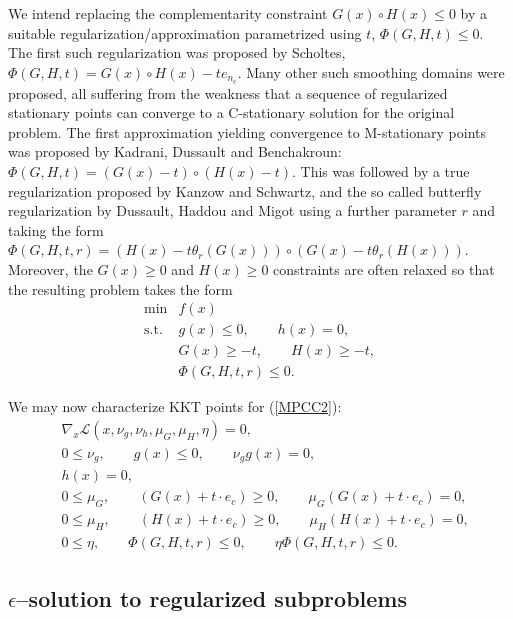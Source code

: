 \documentclass[12pt]{article}
\newcommand{\pref}[1]{(\ref{#1})}
\begin{document}
We intend replacing the complementarity constraint $G(x)\circ H(x)\leq 0$ by a suitable regularization/approximation parametrized using $t$, $\Phi(G,H,t)\le0$. The first such regularization was proposed by Scholtes, $\Phi(G,H,t) = G(x)\circ H(x) - te_{n_c}$. Many other such smoothing domains were proposed, all suffering from the weakness that a sequence of regularized stationary points can converge to a C-stationary solution for the original problem. The first approximation yielding convergence to M-stationary points was proposed by Kadrani, Dussault and Benchakroun: $\Phi(G,H,t) = (G(x)-t)\circ(H(x)-t)$. This was followed by a true regularization proposed by Kanzow and Schwartz, and the so called butterfly regularization by Dussault, Haddou and Migot using a further parameter $r$ and taking the form $\Phi(G,H,t,r) =  (H(x)-t\theta_r(G(x)))\circ(G(x)-t\theta_r(H(x)))$. Moreover, the $G(x)\ge0$ and $H(x)\ge0$ constraints are often relaxed so that the resulting problem takes the form
\begin{equation}\label{MPCC2}
 \begin{array}{ll} 
      \min &f(x)\\
      \textrm{s.t.}
          &g(x)\leq0,\qquad
          h(x)=0,\\
          &G(x)\geq -t,\qquad
          H(x)\geq -t,\\
          &\Phi(G,H,t,r)\le0.
 \end{array}
\end{equation}

We may now characterize KKT points for \pref{MPCC2}:
\begin{equation}\label{stat}
\begin{array}{cl}
&\nabla_{x}\mathcal{L}(x,\nu_g,\nu_h,\mu_{G},\mu_{H},\eta)=0,\\
&0\leq\nu_g, \qquad g(x)\leq0,\qquad \nu_gg(x)=0,\\
&h(x)=0,\\
&0\leq\mu_G, \qquad(G(x)+t\cdot e_c)\geq0, \qquad\mu_G(G(x)+t\cdot e_c)=0, \\
&0\leq\mu_H, \qquad(H(x)+t\cdot e_c)\geq0, \qquad\mu_H(H(x)+t\cdot e_c)=0, \\
&0\leq\eta,\qquad\Phi(G,H,t,r)\leq 0, \qquad\eta\Phi(G,H,t,r)\leq0.
\end{array}
\end{equation}

\subsection{$\epsilon$--solution to regularized subproblems}
\end{document}
